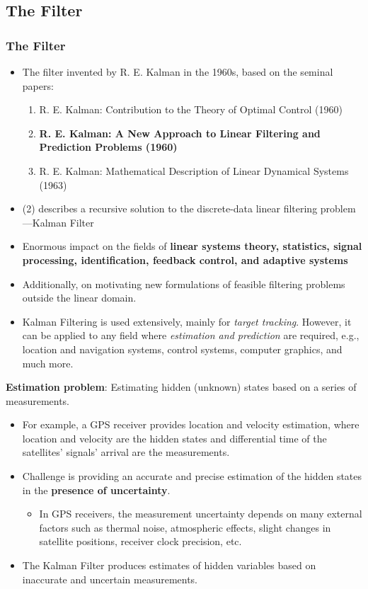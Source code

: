 \subsection{The Filter}
\begin{frame}
   \frametitle{The Filter}
		\begin{itemize}
			\item The filter invented by R. E. Kalman in the 1960s, based on the seminal papers:
			    \begin{enumerate}
			        \item R. E. Kalman: Contribution to the Theory of Optimal Control (1960)
			        \item \textbf{R. E. Kalman: A New Approach to Linear Filtering and Prediction Problems (1960)}
			        \item R. E. Kalman: Mathematical Description of Linear Dynamical Systems (1963)
			    \end{enumerate}
			\item (2) describes a recursive solution to the discrete-data linear filtering problem---Kalman Filter
			
			\item Enormous impact on the fields of \textbf{linear systems theory, statistics, signal processing, identification, feedback control, and adaptive systems}
			
			\item Additionally, on motivating new formulations of feasible filtering problems outside the linear domain. 
			
			\item Kalman Filtering is used extensively, mainly for \textit{target tracking}. However, it can be applied to any field where \textit{estimation and prediction} are required, e.g., location and navigation systems, control systems, computer graphics, and much more.
		\end{itemize}
		
		\vspace{10pt}
		\textbf{Estimation problem}: Estimating hidden (unknown) states based on a series of measurements.
		
		\begin{itemize}
		    \item For example, a GPS receiver provides location and velocity estimation, where location and velocity are the hidden states and differential time of the satellites' signals' arrival are the measurements.
		    \item Challenge is providing an accurate and precise estimation of the hidden states in the \textbf{presence of uncertainty}.
		    \begin{itemize}
		        \item In GPS receivers, the measurement uncertainty depends on many external factors such as thermal noise, atmospheric effects, slight changes in satellite positions, receiver clock precision, etc.
		    \end{itemize}
		   \item The Kalman Filter produces estimates of hidden variables based on inaccurate and uncertain measurements.  
		\end{itemize}
		
		
\end{frame}
